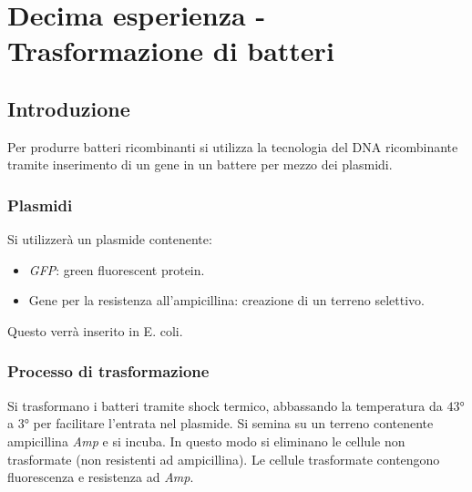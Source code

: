 \section{Decima esperienza - Trasformazione di batteri}

	\subsection{Introduzione}
	Per produrre batteri ricombinanti si utilizza la tecnologia del DNA ricombinante tramite inserimento di un gene in un battere per mezzo dei plasmidi.

		\subsubsection{Plasmidi}
		Si utilizzer\`a un plasmide contenente:
		\begin{multicols}{2}
			\begin{itemize}
				\item \emph{GFP}: green fluorescent protein.
				\item Gene per la resistenza all'ampicillina: creazione di un terreno selettivo.
			\end{itemize}
		\end{multicols}
		Questo verr\`a inserito in E. coli.

		\subsubsection{Processo di trasformazione}
		Si trasformano i batteri tramite shock termico, abbassando la temperatura da $43\si{\degree}$ a $3\si{\degree}$ per facilitare l'entrata nel plasmide.
		Si semina su un terreno contenente ampicillina \emph{Amp} e si incuba.
		In questo modo si eliminano le cellule non trasformate (non resistenti ad ampicillina).
		Le cellule trasformate contengono fluorescenza e resistenza ad \emph{Amp}.



